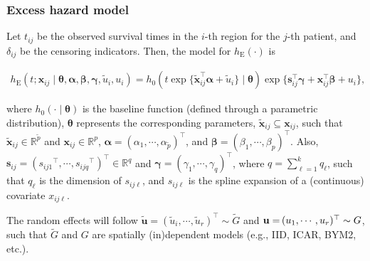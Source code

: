 \documentclass[10pt, aspectratio = 169, handout]{beamer} %
\begin{document}
    \begin{frame}[t]
		\frametitle{Excess hazard model}
		\justifying
        Let $t_{ij}$ be the observed survival times in the $i$-th region for the $j$-th patient, and $\delta_{ij}$ be the censoring indicators. Then, the model for $h_\text{E}(\cdot)$ is
        
        \vspace{-12pt}

        \begin{align} \label{eq:exc-haz}
            h_{\text{E}}(t; \mathbf{x}_{ij} \mid \boldsymbol{\theta}, \boldsymbol{\alpha}, \boldsymbol{\beta}, \boldsymbol{\gamma}, \tilde{u}_i, u_i) = h_0(t \exp\{\tilde{\mathbf{x}}_{ij}^{\top} \boldsymbol{\alpha} + \tilde{u}_i\} \mid  \boldsymbol{\theta}) \exp\{\mathbf{s}_{ij}^{\top} \boldsymbol{\gamma} + \mathbf{x}_{ij}^{\top} \boldsymbol{\beta} + u_i\},
        \end{align}

        where $h_0(\cdot \mid \boldsymbol{\theta})$ is the baseline function (defined through a parametric distribution), $\boldsymbol{\theta}$ represents the corresponding parameters, $\tilde{\mathbf{x}}_{ij} \subseteq \mathbf{x}_{ij}$, such that $\tilde{\mathbf{x}}_{ij} \in \mathbb{R}^{\tilde{p}}$ and $\mathbf{x}_{ij} \in \mathbb{R}^p$, $\boldsymbol{\alpha} = (\alpha_1, \cdots, \alpha_{\tilde{p}})^{\top}$, and $\boldsymbol{\beta} = (\beta_1, \cdots, \beta_{p})^{\top}$. Also, $\mathbf{s}_{ij} = ({s_{ij1}}^{\top}, \cdots, {s_{ijq}}^{\top})^{\top} \in \mathbb{R}^q$ and $\boldsymbol{\gamma} = (\gamma_1, \cdots, \gamma_q)^{\top}$, where $q = \sum_{\ell = 1}^{k}q_{\ell}$, such that $q_{\ell}$ is the dimension of $s_{ij\ell}$, and $s_{ij\ell}$ is the spline expansion of a (continuous) covariate $x_{ij\ell}$. 

        \vspace{5pt}
        
        The random effects will follow $\tilde{\mathbf{u}} = (\tilde{u}_i, \cdots, \tilde{u}_r)^{\top} \sim \tilde{G}$ and $\mathbf{u} = \hspace{-1pt}(u_1, \cdots, u_r)^{\top} \sim G$, such that $\tilde{G}$ and $G$ are spatially (in)dependent models (e.g., IID, ICAR, BYM2, etc.).

	\end{frame}
\end{document}
